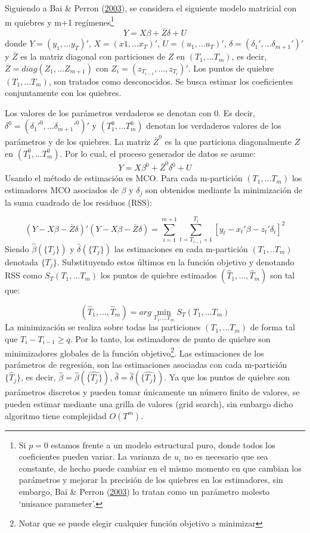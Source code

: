 \documentclass[12pt,oneside]{reedthesis}
\begin{document}
Siguiendo a Bai \& Perron (\protect\hyperlink{ref-BaiPerron2003}{2003}), se considera el siguiente modelo matricial con m quiebres y m+1 regímenes\footnote{Si \(p = 0\) estamos frente a un modelo estructural puro, donde todos los coeficientes pueden variar. La varianza de \(u_i\) no es necesario que sea constante, de hecho puede cambiar en el mismo momento en que cambian los parámetros y mejorar la precisión de los quiebres en los estimadores, sin embargo, Bai \& Perron (\protect\hyperlink{ref-BaiPerron2003}{2003}) lo tratan como un parámetro molesto `nuisance parameter'.}
\begin{equation}
Y = X\beta + \bar{Z}\delta + U
\end{equation}
donde \(Y = (y_1, ...y_T)'\), \(X = (x1, ... x_T)'\), \(U = (u_1, ...u_T)'\), \(\delta = (\delta_1',...\delta_{m+1}')'\) y \(\bar{Z}\) es la matriz diagonal con particiones de \(Z\) en \((T_1, ...T_m)\), es decir, \(\bar{Z} = diag(Z_1, ... Z_{m+1})\) con \(Z_i = (z_{T_{i-1}}, ..., z_{T_{i}})'\). Los puntos de quiebre \((T_1, ...T_m)\), son tratados como desconocidos. Se busca estimar los coeficientes conjuntamente con los quiebres.

Los valores de los parámetros verdaderos se denotan con 0. Es decir, \(\delta^0 = (\delta_{1}'^0,...\delta_{m+1}'^0)'\) y \((T_1^0, ...T_m^0)\) denotan los verdaderos valores de los parámetros y de los quiebres. La matriz \(\bar{Z}^0\) es la que particiona diagonalmente \(Z\) en \((T_1^0, ...T_m^0)\). Por lo cual, el proceso generador de datos se asume:
\begin{equation}
Y = X\beta^0 + \bar{Z}^0\delta^0 + U
\end{equation}
Usando el método de estimación es MCO. Para cada m-partición \((T_1, ...T_m)\) los estimadores MCO asociados de \(\beta\) y \(\delta_j\) son obtenidos mediante la minimización de la suma cuadrado de los residuos (RSS):

\[
(Y - X\beta - \bar{Z}\delta)'(Y - X\beta - \bar{Z}\delta) = \sum_{i=1}^{m+1}\sum_{t = T_{i-1}+1}^{T_i}[y_t-x_t'\beta-z_t'\delta_i]^2
\]
Siendo \(\hat{\beta}(\{T_j\})\) y \(\hat{\delta}(\{T_j\})\) las estimaciones en cada m-partición \((T_1, .. T_m)\) denotada \(\{T_j\}\). Substituyendo estos últimos en la función objetivo y denotando RSS como \(S_T(T_1, ... T_m)\) los puntos de quiebre estimados \((\hat{T}_1, ..., \hat{T}_m)\) son tal que:

\[
(\hat{T}_1, ..., \hat{T}_m) = arg\min_{T_1,...T_m}S_T(T_1, ... T_m)
\]
La minimización se realiza sobre todas las particiones \((T_1, ...T_m)\) de forma tal que \(T_i - T_{i-1} \geq q\). Por lo tanto, los estimadores de punto de quiebre son minimizadores globales de la función objetivo\footnote{Notar que se puede elegir cualquier función objetivo a minimizar}. Las estimaciones de los parámetros de regresión, son las estimaciones asociadas con cada m-partición \(\{{\hat{T}_j}\}\), es decir, \(\hat{\beta} = \hat{\beta}({\hat{\{T_j\}}})\), \(\hat{\delta} = \hat{\delta}({\hat{\{T_j\}}})\). Ya que los puntos de quiebre son parámetros discretos y pueden tomar únicamente un número finito de valores, se pueden estimar mediante una grilla de valores (grid search), sin embargo dicho algoritmo tiene complejidad \(O(T^m)\).
\end{document}
